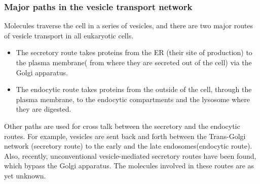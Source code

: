 \subsubsection{Major paths in the vesicle transport network}
Molecules traverse the cell in a series of vesicles, and there are two major routes of vesicle transport in all eukaryotic cells.
%
\begin{itemize}
	\item The secretory route takes proteins from the ER (their site of production) to the plasma membrane( from where they are secreted out of the cell) via the Golgi apparatus\cite{alberts2002molecular}.
	\item The endocytic route takes proteins from the outside of the cell, through the plasma membrane, to the endocytic compartments and the lysosome where they are digested. 
\end{itemize}
Other paths are used for cross talk between the secretory and the endocytic routes. For example, vesicles are sent back and forth between the Trans-Golgi network (secretory route) to the early and the late endosomes(endocytic route)\cite{progida2016bidirectional}. Also, recently, unconventional vesicle-mediated secretory routes have been found, which bypass the Golgi apparatus. The molecules involved in these routes are as yet unknown\cite{nickel2018unconventional}. 
%

